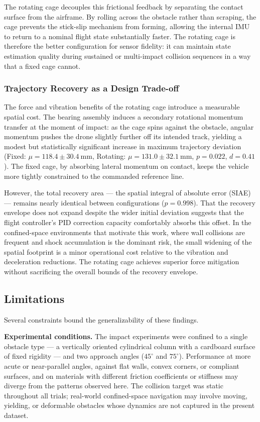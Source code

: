 The rotating cage decouples this frictional feedback by separating the contact surface from the airframe. By rolling across the obstacle rather than scraping, the cage prevents the stick-slip mechanism from forming, allowing the internal IMU to return to a nominal flight state substantially faster. The rotating cage is therefore the better configuration for sensor fidelity: it can maintain state estimation quality during sustained or multi-impact collision sequences in a way that a fixed cage cannot.

\subsubsection{Trajectory Recovery as a Design Trade-off}

The force and vibration benefits of the rotating cage introduce a measurable spatial cost. The bearing assembly induces a secondary rotational momentum transfer at the moment of impact: as the cage spins against the obstacle, angular momentum pushes the drone slightly further off its intended track, yielding a modest but statistically significant increase in maximum trajectory deviation (Fixed: $\mu = 118.4 \pm 30.4\:\text{mm}$, Rotating: $\mu = 131.0 \pm 32.1\:\text{mm}$, $p = 0.022$, $d = 0.41$). The fixed cage, by absorbing lateral momentum on contact, keeps the vehicle more tightly constrained to the commanded reference line.

However, the total recovery area --- the spatial integral of absolute error (SIAE) --- remains nearly identical between configurations ($p = 0.998$). That the recovery envelope does not expand despite the wider initial deviation suggests that the flight controller's PID correction capacity comfortably absorbs this offset. In the confined-space environments that motivate this work, where wall collisions are frequent and shock accumulation is the dominant risk, the small widening of the spatial footprint is a minor operational cost relative to the vibration and deceleration reductions. The rotating cage achieves superior force mitigation without sacrificing the overall bounds of the recovery envelope.

\subsection{Limitations}

Several constraints bound the generalizability of these findings.

\textbf{Experimental conditions.} The impact experiments were confined to a single obstacle type — a vertically oriented cylindrical column with a cardboard surface of fixed rigidity — and two approach angles ($45^\circ$ and $75^\circ$). Performance at more acute or near-parallel angles, against flat walls, convex corners, or compliant surfaces, and on materials with different friction coefficients or stiffness may diverge from the patterns observed here. The collision target was static throughout all trials; real-world confined-space navigation may involve moving, yielding, or deformable obstacles whose dynamics are not captured in the present dataset.

